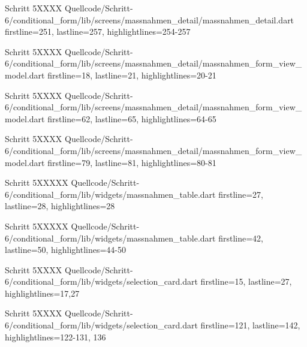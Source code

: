   \begin{alexlisting}{Schritt 5}{XXXX}
    {Quellcode/Schritt-6/conditional_form/lib/screens/massnahmen_detail/massnahmen_detail.dart}
    {firstline=251, lastline=257, highlightlines={254-257}}
    \label{lst:Schritt6XXXXX}
  \end{alexlisting}


  \begin{alexlisting}{Schritt 5}{XXXX}
    {Quellcode/Schritt-6/conditional_form/lib/screens/massnahmen_detail/massnahmen_form_view_model.dart}
    {firstline=18, lastline=21, highlightlines={20-21}}
    \label{lst:Schritt6XXXXX}
  \end{alexlisting}

  \begin{alexlisting}{Schritt 5}{XXXX}
    {Quellcode/Schritt-6/conditional_form/lib/screens/massnahmen_detail/massnahmen_form_view_model.dart}
    {firstline=62, lastline=65, highlightlines={64-65}}
    \label{lst:Schritt6XXXXX}
  \end{alexlisting}

  \begin{alexlisting}{Schritt 5}{XXXX}
    {Quellcode/Schritt-6/conditional_form/lib/screens/massnahmen_detail/massnahmen_form_view_model.dart}
    {firstline=79, lastline=81, highlightlines={80-81}}
    \label{lst:Schritt6XXXXX}
  \end{alexlisting}

  \begin{alexlisting}{Schritt 5}{XXXXX}
    {Quellcode/Schritt-6/conditional_form/lib/widgets/massnahmen_table.dart}
    {firstline=27, lastline=28, highlightlines={28}}
    \label{lst:Schritt6XXXXX}
  \end{alexlisting}

  \begin{alexlisting}{Schritt 5}{XXXXX}
    {Quellcode/Schritt-6/conditional_form/lib/widgets/massnahmen_table.dart}
    {firstline=42, lastline=50, highlightlines={44-50}}
    \label{lst:Schritt6XXXXX}
  \end{alexlisting}

  \begin{alexlisting}{Schritt 5}{XXXX}
    {Quellcode/Schritt-6/conditional_form/lib/widgets/selection_card.dart}
    {firstline=15, lastline=27, highlightlines={17,27}}
    \label{lst:Schritt6XXXX}
\end{alexlisting}

\begin{alexlisting}{Schritt 5}{XXXX}
    {Quellcode/Schritt-6/conditional_form/lib/widgets/selection_card.dart}
    {firstline=121, lastline=142, highlightlines={122-131, 136}}
    \label{lst:Schritt6XXXX}
\end{alexlisting}

\ifincludeall \clearpage \fi 
